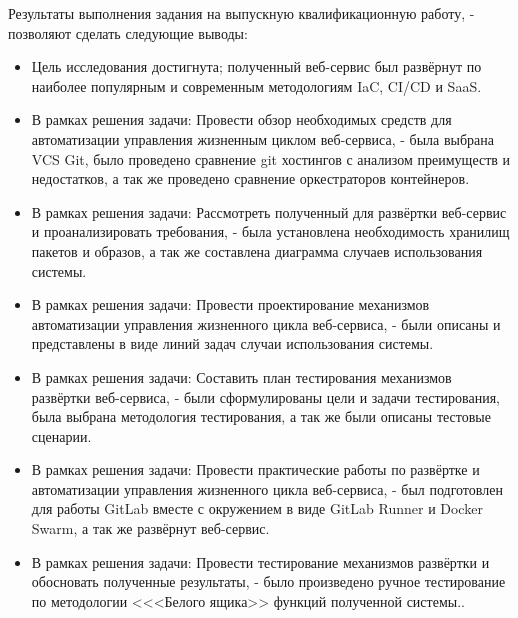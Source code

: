 \Conclusion %

Результаты выполнения задания на выпускную квалификационную работу, - позволяют сделать следующие выводы:
\begin{itemize}
    \item
    Цель исследования достигнута;
    полученный веб-сервис был развёрнут по наиболее популярным и современным методологиям IaC, CI/CD и SaaS.

    \item
    В рамках решения задачи: Провести обзор необходимых средств для автоматизации управления жизненным циклом веб-сервиса,
    - была выбрана VCS Git, было проведено сравнение git хостингов с анализом преимуществ и недостатков, а так же проведено сравнение оркестраторов контейнеров.

    \item
    В рамках решения задачи: Рассмотреть полученный для развёртки веб-сервис и проанализировать требования,
    - была установлена необходимость хранилищ пакетов и образов, а так же составлена диаграмма случаев использования системы.

    \item
    В рамках решения задачи: Провести проектирование механизмов автоматизации управления жизненного цикла веб-сервиса,
    - были описаны и представлены в виде линий задач случаи использования системы.

    \item
    В рамках решения задачи: Составить план тестирования механизмов развёртки веб-сервиса,
    - были сформулированы цели и задачи тестирования, была выбрана методология тестирования, а так же были описаны тестовые сценарии.

    \item
    В рамках решения задачи: Провести практические работы по развёртке и автоматизации управления жизненного цикла веб-сервиса,
    - был подготовлен для работы GitLab вместе с окружением в виде GitLab Runner и Docker Swarm, а так же развёрнут веб-сервис.

    \item
    В рамках решения задачи: Провести тестирование механизмов развёртки и обосновать полученные результаты,
    - было произведено ручное тестирование по методологии <<<Белого ящика>> функций полученной системы..
\end{itemize}


